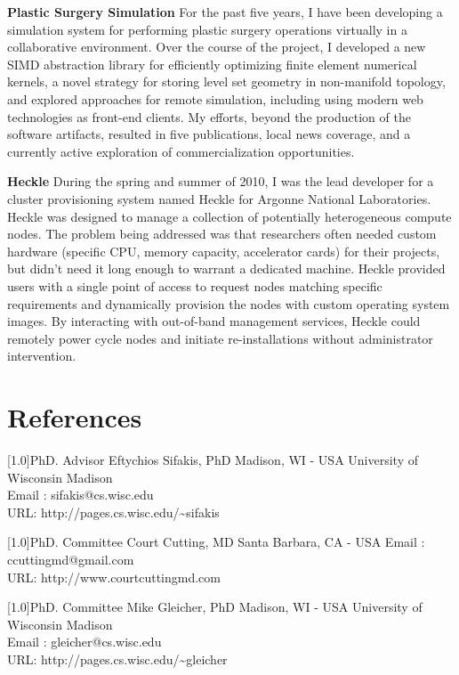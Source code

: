 \documentclass{cv-style}     %
\begin{document}
\textbf{Plastic Surgery Simulation} For the past five years, I have
been developing a simulation system for performing plastic surgery
operations virtually in a collaborative environment. Over the course
of the project, I developed a new SIMD abstraction library for
efficiently optimizing finite element numerical kernels, a novel
strategy for storing level set geometry in non-manifold topology, and
explored approaches for remote simulation, including using modern web
technologies as front-end clients. My efforts, beyond the production
of the software artifacts, resulted in five publications, local news
coverage, and a currently active exploration of commercialization
opportunities.

\textbf{Heckle} During the spring and summer of 2010, I was the lead
developer for a cluster provisioning system named Heckle for Argonne
National Laboratories. Heckle was designed to manage a collection of
potentially heterogeneous compute nodes. The problem being addressed
was that researchers often needed custom hardware (specific CPU,
memory capacity, accelerator cards) for their projects, but didn't
need it long enough to warrant a dedicated machine. Heckle provided users with a single
point of access to request nodes matching specific requirements and
dynamically provision the nodes with custom operating system
images. By interacting with out-of-band management services, Heckle
could remotely power cycle nodes and initiate re-installations without
administrator intervention.



\section{References}
  \vspace{-0.2cm}

\begin{entrylist}


 \entry
{\scalebox{.8}[1.0]{PhD. Advisor}}
 {Eftychios Sifakis, PhD}
 {Madison, WI - USA}
{
 University of Wisconsin Madison\\
Email : sifakis@cs.wisc.edu\\
URL: http://pages.cs.wisc.edu/\textasciitilde{}sifakis
 } 

 \entry
{\scalebox{.8}[1.0]{PhD. Committee}}
 {Court Cutting, MD}
 {Santa Barbara, CA - USA}
{
Email : ccuttingmd@gmail.com\\
URL: http://www.courtcuttingmd.com
 } 


 \entry
{\scalebox{.8}[1.0]{PhD. Committee}}
 {Mike Gleicher, PhD}
 {Madison, WI - USA}
{
 University of Wisconsin Madison\\
Email : gleicher@cs.wisc.edu\\
URL: http://pages.cs.wisc.edu/\textasciitilde{}gleicher
 } 




\end{entrylist}
\end{document}
